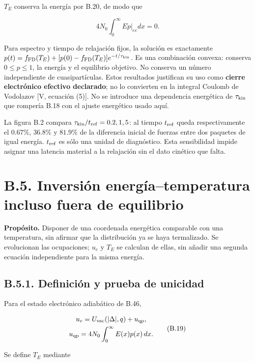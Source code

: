 \documentclass[
  spanish,
  10pt,
  a4paper,
]{article}
\begin{document}
\(T_E\) conserva la energía por B.20, de modo que

\[
4N_0\int_0^\infty E\left.\dot p\right|_{ee}dx=0.
\tag{B.18}
\]

Para espectro y tiempo de relajación fijos, la solución es exactamente
\(p(t)=f_{\rm FD}(T_E)+[p(0)-f_{\rm FD}(T_E)]e^{-t/\tau_{\rm kin}}\). Es
una combinación convexa: conserva \(0\leq p\leq1\), la energía y el
equilibrio objetivo. No conserva un número independiente de
cuasipartículas. Estos resultados justifican su uso como \textbf{cierre
electrónico efectivo declarado}; no lo convierten en la integral Coulomb
de Vodolazov {[}V, ecuación (5){]}. No se introduce una dependencia
energética de \(\tau_{\rm kin}\) que rompería B.18 con el ajuste
energético usado aquí.

La figura B.2 compara \(\tau_{\rm kin}/t_{\rm ref}=0.2,1,5\): al tiempo
\(t_{\rm ref}\) queda respectivamente el \(0.67\%\), \(36.8\%\) y
\(81.9\%\) de la diferencia inicial de fuerzas entre dos paquetes de
igual energía. \(t_{\rm ref}\) es sólo una unidad de diagnóstico. Esta
sensibilidad impide asignar una latencia material a la relajación sin el
dato cinético que falta.

\section{B.5. Inversión energía--temperatura incluso fuera de
equilibrio}\label{b.5.-inversiuxf3n-energuxedatemperatura-incluso-fuera-de-equilibrio}

\textbf{Propósito.} Disponer de una coordenada energética comparable con
una temperatura, sin afirmar que la distribución ya se haya termalizado.
Se evolucionan las ocupaciones; \(u_e\) y \(T_E\) se calculan de ellas,
sin añadir una segunda ecuación independiente para la misma energía.

\subsection{B.5.1. Definición y prueba de
unicidad}\label{b.5.1.-definiciuxf3n-y-prueba-de-unicidad}

Para el estado electrónico adiabático de B.46,

\[
\begin{gathered}
u_e=U_{\rm vac}(|\Delta|,q)+u_{\rm qp},\\
u_{\rm qp}=4N_0\int_0^\infty E(x)p(x)\,dx.
\end{gathered} \tag{B.19}
\]

Se define \(T_E\) mediante
\end{document}
